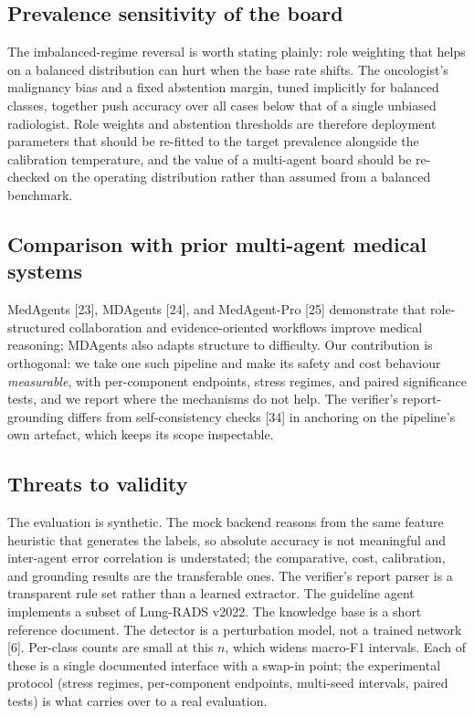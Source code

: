 \documentclass[12pt]{article}
\begin{document}
\subsection{Prevalence sensitivity of the board}

The imbalanced-regime reversal is worth stating plainly: role weighting that helps on a balanced distribution can hurt when the base rate shifts. The oncologist's malignancy bias and a fixed abstention margin, tuned implicitly for balanced classes, together push accuracy over all cases below that of a single unbiased radiologist. Role weights and abstention thresholds are therefore deployment parameters that should be re-fitted to the target prevalence alongside the calibration temperature, and the value of a multi-agent board should be re-checked on the operating distribution rather than assumed from a balanced benchmark.

\subsection{Comparison with prior multi-agent medical systems}

MedAgents [23], MDAgents [24], and MedAgent-Pro [25] demonstrate that role-structured collaboration and evidence-oriented workflows improve medical reasoning; MDAgents also adapts structure to difficulty. Our contribution is orthogonal: we take one such pipeline and make its safety and cost behaviour \emph{measurable}, with per-component endpoints, stress regimes, and paired significance tests, and we report where the mechanisms do not help. The verifier's report-grounding differs from self-consistency checks [34] in anchoring on the pipeline's own artefact, which keeps its scope inspectable.

\subsection{Threats to validity}

The evaluation is synthetic. The mock backend reasons from the same feature heuristic that generates the labels, so absolute accuracy is not meaningful and inter-agent error correlation is understated; the comparative, cost, calibration, and grounding results are the transferable ones. The verifier's report parser is a transparent rule set rather than a learned extractor. The guideline agent implements a subset of Lung-RADS v2022. The knowledge base is a short reference document. The detector is a perturbation model, not a trained network [6]. Per-class counts are small at this $n$, which widens macro-F1 intervals. Each of these is a single documented interface with a swap-in point; the experimental protocol (stress regimes, per-component endpoints, multi-seed intervals, paired tests) is what carries over to a real evaluation.
\end{document}
